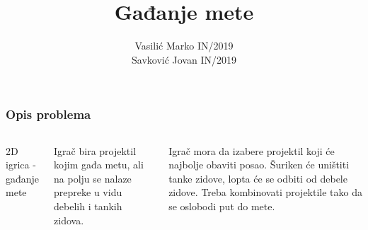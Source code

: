 \documentclass{beamer}
\title{Gađanje mete}
\author{Vasilić Marko IN/2019\\ Savković Jovan IN/2019}
\date{}
\begin{document}
\frame{\titlepage}

\begin{frame}
	\frametitle{Opis problema}

	\begin{columns}
		2D igrica - gađanje mete
		
		Igrač bira projektil kojim gađa metu, ali na polju se nalaze prepreke u vidu debelih i tankih zidova.

		Igrač mora da izabere projektil koji će najbolje obaviti posao. Šuriken će uništiti tanke zidove, lopta će se odbiti od debele zidove. Treba kombinovati projektile tako da se oslobodi put do mete.
		
	\end{columns}
\end{frame}
\end{document}
